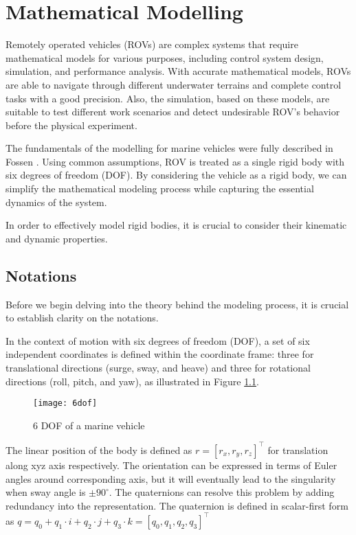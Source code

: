 \chapter{Mathematical Modelling}
\label{chap:mat}


    Remotely operated vehicles (ROVs) are complex systems that require mathematical models for various purposes, 
    including control system design, simulation, and performance analysis. With accurate mathematical models, 
    ROVs are able to navigate through different underwater terrains and complete control tasks with a good 
    precision. Also, the simulation, based on these models, are suitable to test different work scenarios and 
    detect undesirable ROV's behavior before the physical experiment.   
    
    The fundamentals of the modelling for marine vehicles were fully described in Fossen \cite{fossen:guidance}.
    Using common assumptions, ROV is treated as a single rigid body with six degrees of freedom (DOF).
    By considering the vehicle as a rigid body, we can simplify the mathematical modeling process while capturing the essential dynamics 
    of the system.

    In order to effectively model rigid bodies, it is crucial to consider their kinematic and dynamic properties.
\section{Notations}

    Before we begin delving into the theory behind the modeling process, 
    it is crucial to establish clarity on the notations. 

    In the context of motion with six degrees of freedom (DOF), 
    a set of six independent coordinates is defined within the 
    coordinate frame: three for translational directions 
    (surge, sway, and heave) and three for rotational directions 
    (roll, pitch, and yaw), as illustrated in Figure \ref{image:6dof}.

    \begin{figure}[H]
        \centering\texttt{[image: 6dof]}
        \caption{6 DOF of a marine vehicle}
        \label{image:6dof}
    \end{figure}

    The linear position of the body is defined as $r = [r_x, r_y, r_z]^\top$ for translation along xyz axis respectively.
    The orientation can be expressed in terms of Euler angles around corresponding axis, but it will eventually lead 
    to the singularity when sway angle is $± 90^{\circ}$. 
    The quaternions can resolve this problem by adding redundancy into the representation. 
    The quaternion is defined in scalar-first form as 
    $q = q_0 + q_1\cdot i + q_2\cdot j + q_3\cdot k = [q_0, q_1, q_2, q_3]^\top$

